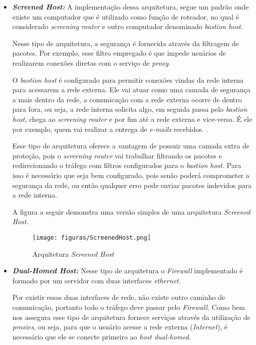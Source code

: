 \begin{itemize}
\item \textbf{\textit{Screened Host:}} A implementação dessa arquitetura, segue um padrão onde existe um computador que é utilizado como função de roteador, no qual é considerado \textit{screening router} e outro computador denominado \textit{bastion host}.

Nesse tipo de arquitetura, a segurança é fornecida através da filtragem de pacotes. Por exemplo, esse filtro empregado é que impede usuários de realizarem conexões diretas com o serviço de \textit{proxy}.

O \textit{bastion host} é configurado para permitir conexões vindas da rede interna para acessarem a rede externa. Ele vai atuar como uma camada de segurança a mais dentro da rede, a comunicação com a rede externa ocorre de dentro para fora, ou seja, a rede interna solicita algo, em seguida passa pelo \textit{bastion host}, chega ao \textit{screening router} e por fim até a rede externa e vice-versa. É ele por exemplo, quem vai realizar a entrega de \textit{e-mails} recebidos. \cite{zwicky2000}.

Esse tipo de arquitetura oferece a vantagem de possuir uma camada extra de proteção, pois o \textit{screening router} vai trabalhar filtrando os pacotes e redirecionando o tráfego com filtros configurados para o \textit{bastion host}. Para isso é necessário que seja bem configurado, pois senão poderá comprometer a segurança da rede, ou então qualquer erro pode enviar pacotes indevidos para a rede interna. 

A figura a seguir demonstra uma versão simples de uma arquitetura \textit{Screened Host}.

\begin{figure}[!h]
\centering
\texttt{[image: figuras/ScreenedHost.png]}
\caption{Arquitetura \textit{Screened Host}} 	
\end{figure}

\item \textbf{\textit{Dual-Homed Host:}} Nesse tipo de arquitetura o \textit{Firewall} implementado é formado por um servidor com duas interfaces \textit{ethernet}.

Por existir essas duas interfaces de rede, não existe outro caminho de comunicação, portanto todo o tráfego deve passar pelo \textit{Firewall}. Como bem nos assegura  esse tipo de arquitetura fornece serviços através da utilização de \textit{proxies}, ou seja, para que o usuário acesse a rede externa (\textit{Internet}), é necessário que ele se conecte primeiro ao \textit{host dual-homed}.


\end{itemize}
